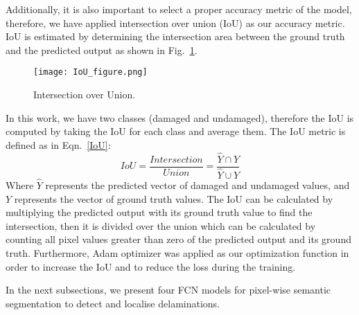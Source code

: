 Additionally, it is also important to select a proper accuracy metric of the model, therefore, we have applied intersection over union (IoU) as our accuracy metric. 
IoU is estimated by determining the intersection area between the ground truth and the predicted output as shown in Fig.~\ref{fig:iou}.
\begin{figure}
	\centering
	\texttt{[image: IoU\_figure.png]}
	\caption{Intersection over Union.}
	\label{fig:iou}
\end{figure}
In this work, we have two classes (damaged and undamaged), therefore the IoU is computed by taking the IoU for each class and average them.
The IoU metric is defined as in Eqn.~\ref{IoU}:
\begin{equation}
IoU = \frac{Intersection}{Union} = \frac{\hat{Y} \cap Y}{\hat{Y} \cup Y} 
\label{IoU}
\end{equation}
Where \(\hat{Y}\) represents the predicted vector of damaged and undamaged values, and \(Y\) represents the vector of ground truth values.
The IoU can be calculated by multiplying the predicted output with its ground truth value to find the intersection, then it is divided over the union which can be calculated by counting all pixel values greater than zero of the predicted output and its ground truth.
Furthermore, Adam optimizer was applied as our optimization function in order to increase the IoU and to reduce the loss during the training.

In the next subsections, we present four FCN models for pixel-wise semantic segmentation to detect and localise delaminations.
